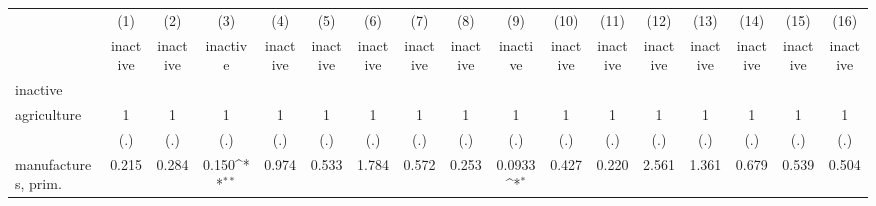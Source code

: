 {
\def\sym#1{\ifmmode^{#1}\else\(^{#1}\)\fi}
\begin{tabular}{l*{16}{c}}
\hline\hline
                    &\multicolumn{1}{c}{(1)}&\multicolumn{1}{c}{(2)}&\multicolumn{1}{c}{(3)}&\multicolumn{1}{c}{(4)}&\multicolumn{1}{c}{(5)}&\multicolumn{1}{c}{(6)}&\multicolumn{1}{c}{(7)}&\multicolumn{1}{c}{(8)}&\multicolumn{1}{c}{(9)}&\multicolumn{1}{c}{(10)}&\multicolumn{1}{c}{(11)}&\multicolumn{1}{c}{(12)}&\multicolumn{1}{c}{(13)}&\multicolumn{1}{c}{(14)}&\multicolumn{1}{c}{(15)}&\multicolumn{1}{c}{(16)}\\
                    &\multicolumn{1}{c}{inactive}&\multicolumn{1}{c}{inactive}&\multicolumn{1}{c}{inactive}&\multicolumn{1}{c}{inactive}&\multicolumn{1}{c}{inactive}&\multicolumn{1}{c}{inactive}&\multicolumn{1}{c}{inactive}&\multicolumn{1}{c}{inactive}&\multicolumn{1}{c}{inactive}&\multicolumn{1}{c}{inactive}&\multicolumn{1}{c}{inactive}&\multicolumn{1}{c}{inactive}&\multicolumn{1}{c}{inactive}&\multicolumn{1}{c}{inactive}&\multicolumn{1}{c}{inactive}&\multicolumn{1}{c}{inactive}\\
\hline
inactive            &                     &                     &                     &                     &                     &                     &                     &                     &                     &                     &                     &                     &                     &                     &                     &                     \\
agriculture         &           1         &           1         &           1         &           1         &           1         &           1         &           1         &           1         &           1         &           1         &           1         &           1         &           1         &           1         &           1         &           1         \\
                    &         (.)         &         (.)         &         (.)         &         (.)         &         (.)         &         (.)         &         (.)         &         (.)         &         (.)         &         (.)         &         (.)         &         (.)         &         (.)         &         (.)         &         (.)         &         (.)         \\
[1em]
manufactures, prim. &       0.215         &       0.284         &       0.150\sym{**} &       0.974         &       0.533         &       1.784         &       0.572         &       0.253         &      0.0933\sym{*}  &       0.427         &       0.220         &       2.561         &       1.361         &       0.679         &       0.539         &       0.504         \\

\end{tabular}}
